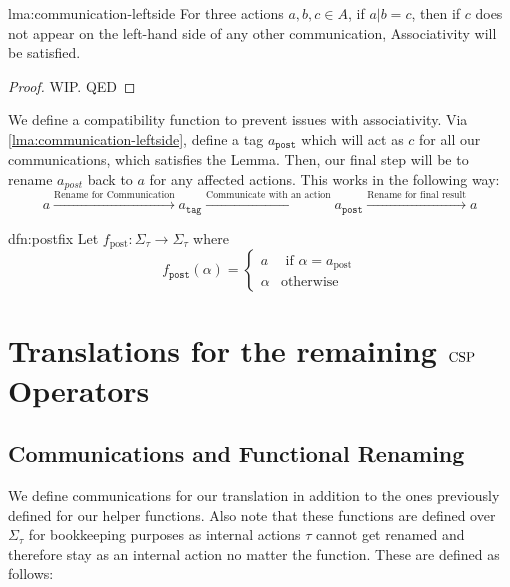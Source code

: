 \documentclass[../hons_project.tex]{subfiles}
\begin{document}
\begin{lma}{lma:communication-leftside}{}
	For three actions $a,b,c\in A$, if $a | b = c$, then if $c$ does not appear on the left-hand side of any other communication, Associativity will be satisfied.
\end{lma}
\begin{proof}
	WIP. QED
\end{proof}

We define a compatibility function to prevent issues with associativity. Via \ref{lma:communication-leftside}, define a tag $a_{\mathtt{post}}$ which will act as $c$ for all our communications, which satisfies the Lemma. Then, our final step will be to rename $a_{post}$ back to $a$ for any affected actions. This works in the following way:
\[a \xrightarrow{\text{Rename for Communication}} a_{\mathtt{tag}} \xrightarrow{\text{Communicate with an action}} a_{\mathtt{post}} \xrightarrow{\text{Rename for final result}} a\]

\begin{dfn}{dfn:postfix}{}
	Let $f_{\mathrm{post}} : \Sigma_{\tau} \to \Sigma_{\tau}$ where
	\vspace{-5pt}
	\[f_{\mathtt{post}}(\alpha) = \begin{cases}
			a      & \text{ if } \alpha = a_{\mathrm{post}} \\
			\alpha & \text{otherwise}
		\end{cases}\]
\end{dfn}

\newpage
\section{Translations for the remaining \texorpdfstring{$\mathrm{CSP}$}{CSP} Operators}

\subsection{Communications and Functional Renaming}

We define communications for our translation in addition to the ones previously defined for our helper functions. Also note that these functions are defined over $\Sigma_{\tau}$ for bookkeeping purposes as internal actions $\tau$ cannot get renamed and therefore stay as an internal action no matter the function. These are defined as follows:
\end{document}
